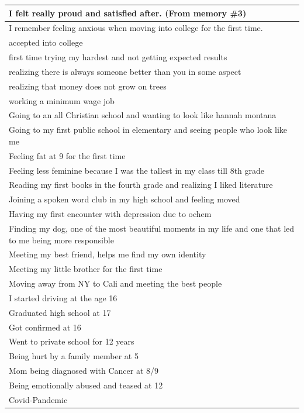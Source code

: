 \documentclass[
  .7em,
  letterpaper,
  DIV=11,
  numbers=noendperiod]{scrartcl}
\begin{document}
\begin{table}
\begin{tabular}{l}
\hline
I felt really proud and satisfied after. (From memory \#3)\\
\hline
I remember feeling anxious when moving into college for the first time.\\
\hline
accepted into college\\
\hline
first time trying my hardest and not getting expected results\\
\hline
realizing there is always someone better than you in some aspect\\
\hline
realizing that money does not grow on trees\\
\hline
working a minimum wage job\\
\hline
Going to an all Christian school and wanting to look like hannah montana\\
\hline
Going to my first public school in elementary and seeing people who look like me\\
\hline
Feeling fat at 9 for the first time\\
\hline
Feeling less feminine because I was the tallest in my class till 8th grade\\
\hline
Reading my first books in the fourth grade and realizing I liked literature\\
\hline
Joining a spoken word club in my high school and feeling moved\\
\hline
Having my first encounter with depression due to ochem\\
\hline
Finding my dog, one of the most beautiful moments in my life and one that led to me being more responsible\\
\hline
Meeting my best friend, helps me find my own identity\\
\hline
Meeting my little brother for the first time\\
\hline
Moving away from NY to Cali and meeting the best people\\
\hline
I started driving at the age 16\\
\hline
Graduated high school at 17\\
\hline
Got confirmed at 16\\
\hline
Went to private school for 12 years\\
\hline
Being hurt by a family member at 5\\
\hline
Mom being diagnosed with Cancer at 8/9\\
\hline
Being emotionally abused and teased at 12\\
\hline
Covid-Pandemic\\
\hline

\end{tabular}
\end{table}
\end{document}
